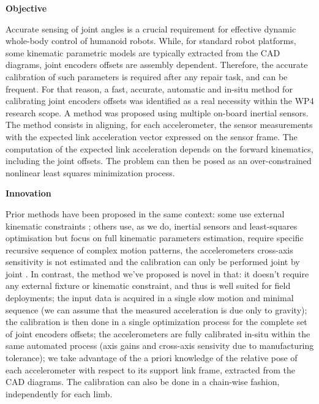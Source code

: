 
\textbf{Objective}

Accurate sensing of joint angles is a crucial requirement for effective dynamic whole-body control of humanoid robots. While, for standard robot platforms, some kinematic parametric models are typically extracted from the CAD diagrams, joint encoders offsets are assembly dependent. Therefore, the accurate calibration of such parameters is required after any repair task, and can be frequent. For that reason, a fast, accurate, automatic and in-situ method for calibrating joint encoders offsets was identified as a real necessity within the WP4 research scope. A method was proposed using multiple on-board inertial sensors. The method consists in aligning, for each accelerometer, the sensor measurements with the expected link acceleration vector expressed on the sensor frame. The computation of the expected link acceleration depends on the forward kinematics, including the joint offsets. The problem can then be posed as an over-constrained nonlinear least squares minimization process.

\textbf{Innovation}

Prior methods have been proposed in the same context: some use external kinematic constraints \cite{Hollerbach2008} \cite{Liu2009}; others use, as we do, inertial sensors and least-squares optimisation but focus on full kinematic parameters estimation, require specific recursive sequence of complex motion patterns, the accelerometers cross-axis sensitivity is not estimated and the calibration can only be performed joint by joint \cite{Wieser2011} \cite{Mittendorfer2012} \cite{Mittendorfer2014}. In contrast, the method we've proposed is novel in that: it doesn't require any external fixture or kinematic constraint, and thus is well suited for field deployments; the input data is acquired in a single slow motion and minimal sequence (we can assume that the measured acceleration is due only to gravity); the calibration is then done in a single optimization process for the complete set of joint encoders offsets; the accelerometers are fully calibrated in-situ within the same automated process (axis gains and cross-axis sensivity due to manufacturing tolerance); we take advantage of the a priori knowledge of the relative pose of each accelerometer with respect to its support link frame, extracted from the CAD diagrams. The calibration can also be done in a chain-wise fashion, independently for each limb.

